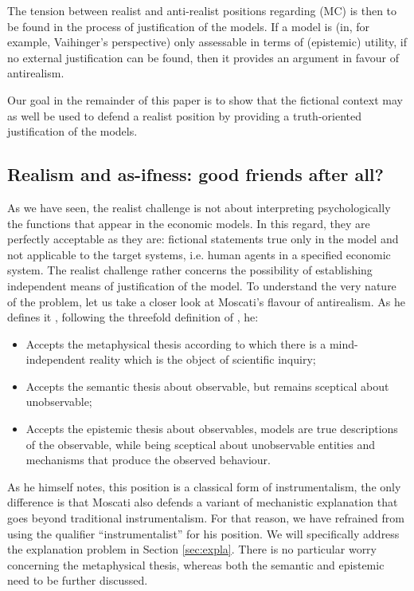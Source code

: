\documentclass[a4paper,11pt]{article}
\theoremstyle{definition}
\begin{document}
The tension between realist and anti-realist positions regarding (MC) is then to be found in the process of justification of the models. If a model is (in, for example, Vaihinger's perspective) only assessable in terms of (epistemic) utility, if no external justification can be found, then it provides an argument in favour of antirealism.

Our goal in the remainder of this paper is to show that the fictional context may as well be used to defend a realist position by providing a truth-oriented justification of the models.

\subsection{Realism and as-ifness: good friends after all?}
As we have seen, the realist challenge is not about interpreting psychologically the functions that appear in the economic models. In this regard, they are perfectly acceptable as they are: fictional statements true only in the model and not applicable to the target systems, i.e. human agents in a specified economic system. The realist challenge rather concerns the possibility of establishing independent means of justification of the model. To understand the very nature of the problem, let us take a closer look at Moscati's flavour of antirealism. As he defines it \citep[pp.~18-20]{Moscati2023}, following the threefold definition of \citep{Psillos1999}, he:

\begin{itemize}
    \item Accepts the metaphysical thesis according to which there is a mind-independent reality which is the object of scientific inquiry;
    \item Accepts the semantic thesis about observable, but remains sceptical about unobservable;
    \item Accepts the epistemic thesis about observables, models are true descriptions of the observable, while being sceptical about unobservable entities and mechanisms that produce the observed behaviour.
\end{itemize}

As he himself notes, this position is a classical form of instrumentalism, the only difference is that Moscati also defends a variant of mechanistic explanation that goes beyond traditional instrumentalism. For that reason, we have refrained from using the qualifier ``instrumentalist'' for his position. We will specifically address the explanation problem in Section \ref{sec:expla}. There is no particular worry concerning the metaphysical thesis, whereas both the semantic and epistemic need to be further discussed. 
\end{document}
